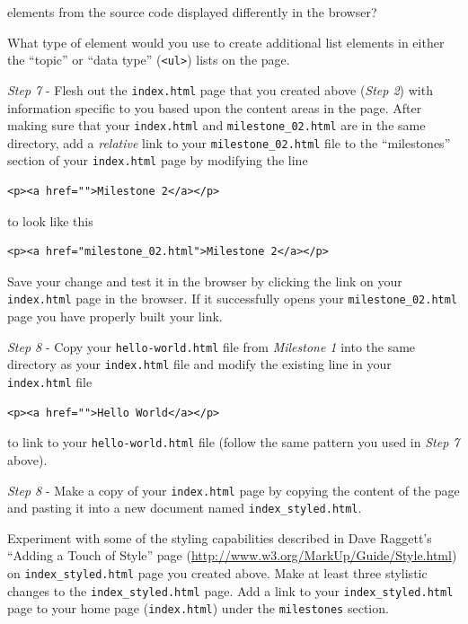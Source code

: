 \documentclass[]{book}
\providecommand{\tightlist}{%
  \setlength{\itemsep}{0pt}\setlength{\parskip}{0pt}}
\begin{document}
elements from the source code displayed differently in the browser?

\begin{description}
\tightlist
\item[Question 3]
What type of element would you use to create additional list elements in
either the ``topic'' or ``data type''
(\texttt{\textless{}ul\textgreater{}}) lists on the page.
\end{description}

\emph{Step 7} - Flesh out the \texttt{index.html} page that you created
above (\emph{Step 2}) with information specific to you based upon the
content areas in the page. After making sure that your
\texttt{index.html} and \texttt{milestone\_02.html} are in the same
directory, add a \emph{relative} link to your
\texttt{milestone\_02.html} file to the ``milestones'' section of your
\texttt{index.html} page by modifying the line

\begin{verbatim}
<p><a href="">Milestone 2</a></p>
\end{verbatim}

to look like this

\begin{verbatim}
<p><a href="milestone_02.html">Milestone 2</a></p>
\end{verbatim}

Save your change and test it in the browser by clicking the link on your
\texttt{index.html} page in the browser. If it successfully opens your
\texttt{milestone\_02.html} page you have properly built your link.

\emph{Step 8} - Copy your \texttt{hello-world.html} file from
\emph{Milestone 1} into the same directory as your \texttt{index.html}
file and modify the existing line in your \texttt{index.html} file

\begin{verbatim}
<p><a href="">Hello World</a></p>
\end{verbatim}

to link to your \texttt{hello-world.html} file (follow the same pattern
you used in \emph{Step 7} above).

\emph{Step 8} - Make a copy of your \texttt{index.html} page by copying
the content of the page and pasting it into a new document named
\texttt{index\_styled.html}.

Experiment with some of the styling capabilities described in Dave
Raggett's ``Adding a Touch of Style'' page
(\url{http://www.w3.org/MarkUp/Guide/Style.html}) on
\texttt{index\_styled.html} page you created above. Make at least three
stylistic changes to the \texttt{index\_styled.html} page. Add a link to
your \texttt{index\_styled.html} page to your home page
(\texttt{index.html}) under the \texttt{milestones} section.
\end{document}
